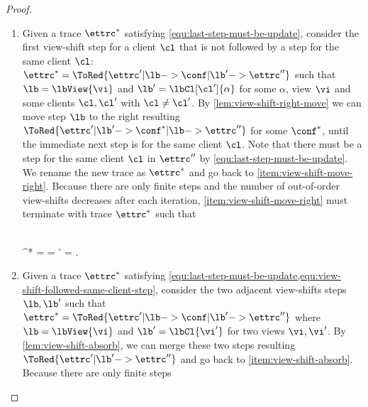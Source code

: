 \begin{proof}
\begin{enumerate}
\begin{Formulae}
\begin{Formula}
    \implies \alpha \in \Fingerprints. \label{equ:last-step-must-be-update}
    \end{Formula}
    \end{Formulae}
\item \label{item:view-shift-move-right}
    Given a trace \( \ettrc^* \) satisfying \cref{equ:last-step-must-be-update},
    consider the first view-shift step \lb for a client \( \cl \)
    that is not followed by a step for the same client \( \cl \):
    \( \ettrc^* =  \ToRed{\ettrc' | \lb -> \conf | \lb' -> \ettrc'' } \) 
    such that \( \lb = \lbView{\vi} \) and \( \lb' = \lbCl[\cl']{\alpha} \)
    for some \( \alpha\), 
    view \( \vi \) and some clients \( \cl, \cl' \) with \( \cl \neq \cl' \).
    By \cref{lem:view-shift-right-move} we can move step \( \lb \) to the right resulting
    \(  \ToRed{\ettrc' | \lb' ->  \conf^* | \lb -> \ettrc''} \) for some \( \conf^* \),
    until the immediate next step is for the same client \( \cl \).
    Note that there must be a step for the same client \( \cl \) in \( \ettrc'' \) 
    by \cref{equ:last-step-must-be-update}.
    We rename the new trace as \( \ettrc^* \) and go back to \cref{item:view-shift-move-right}.
    Because there are only finite steps 
    and the number of out-of-order view-shifts decreases after each iteration,
    \cref{item:view-shift-move-right} must terminate with trace \( \ettrc^* \) such that
    \begin{Formulae}
    \begin{Formula}
    \\ \ettrc^* =  
    \land \lb = \lbView{\vi}
    \implies \lb' = \lbCl[\cl]{\stub}.
    \label{equ:view-shift-followed-same-client-step}
    \end{Formula}
    \end{Formulae}
\item \label{item:view-shift-absorb}
    Given a trace \( \ettrc^* \) satisfying 
    \cref{equ:last-step-must-be-update,equ:view-shift-followed-same-client-step},
    consider the two adjacent view-shifts steps \(\lb, \lb'\) such that
    \( \ettrc^* =  \ToRed{\ettrc' | \lb -> \conf | \lb' -> \ettrc''} \) 
    where \( \lb = \lbView{\vi} \) and \( \lb' = \lbCl{\vi'} \) for two views \( \vi,\vi'\).
    By \cref{lem:view-shift-absorb}, we can merge these two steps resulting
    \(  \ToRed{\ettrc' | \lb' -> \ettrc'' }  \) and go back to \cref{item:view-shift-absorb}.
    Because there are only finite steps 

\end{enumerate}
\end{proof}
